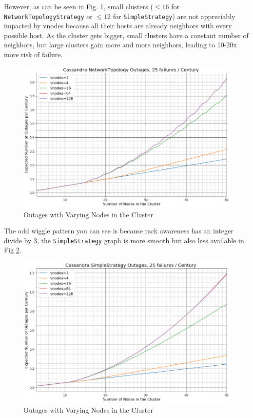 \documentclass{article}
\begin{document}
However, as can be seen in Fig. \ref{fig:outages_nodes_small}, small clusters
($\leq16$ for \texttt{NetworkTopologyStrategy} or $\leq12$ for
\texttt{SimpleStrategy}) are not appreciably impacted by vnodes because all their
hosts are already neighbors with every possible host. As the cluster gets bigger,
small clusters have a constant number of neighbors, but large clusters gain more
and more neighbors, leading to 10-20x more risk of failure.

\begin{figure}[h]
    \centering
    \includegraphics[width=1.0\textwidth]{images/outages_nodes_small.png}
    \caption{Outages with Varying Nodes in the Cluster}
    \label{fig:outages_nodes_small}
\end{figure}

The odd wiggle pattern you can see is because rack awareness has an integer
divide by 3, the \texttt{SimpleStrategy} graph is more smooth but also
less available in Fig \ref{fig:outages_nodes_small_simple}.

\begin{figure}[h]
    \centering
    \includegraphics[width=1.0\textwidth]{images/outages_nodes_small_simple.png}
    \caption{Outages with Varying Nodes in the Cluster}
    \label{fig:outages_nodes_small_simple}
\end{figure}
\end{document}
